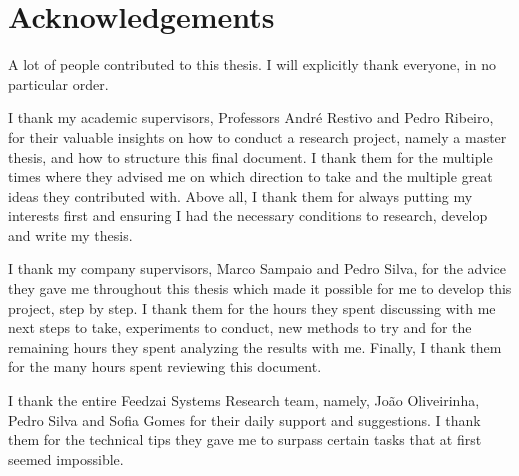 \chapter*{Acknowledgements}

A lot of people contributed to this thesis. I will explicitly thank everyone, in no particular order.

I thank my academic supervisors, Professors André Restivo and Pedro Ribeiro, for their valuable insights on how to conduct a research project, namely a master thesis, and how to structure this final document. I thank them for the multiple times where they advised me on which direction to take and the multiple great ideas they contributed with. Above all, I thank them for always putting my interests first and ensuring I had the necessary conditions to research, develop and write my thesis.

I thank my company supervisors, Marco Sampaio and Pedro Silva, for the advice they gave me throughout this thesis which made it possible for me to develop this project, step by step. I thank them for the hours they spent discussing with me next steps to take, experiments to conduct, new methods to try and for the remaining hours they spent analyzing the results with me. Finally, I thank them for the many hours spent reviewing this document.

I thank the entire Feedzai Systems Research team, namely, João Oliveirinha, Pedro Silva and Sofia Gomes for their daily support and suggestions. I thank them for the technical tips they gave me to surpass certain tasks that at first seemed impossible. 

\vspace{10mm}
